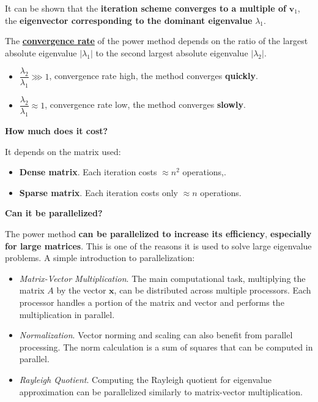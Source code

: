 It can be shown that the \textbf{iteration scheme converges to a multiple of} $\mathbf{v}_{1}$, the \textbf{eigenvector corresponding to the dominant eigenvalue} $\lambda_{1}$.

\highspace
The \textbf{\underline{convergence rate}} of the power method depends on the ratio of the largest absolute eigenvalue $\left|\lambda_{1}\right|$ to the second largest absolute eigenvalue $\left|\lambda_{2}\right|$.
\begin{itemize}
    \item $\dfrac{\lambda_{2}}{\lambda_{1}} \ggg 1$, convergence rate high, the method converges \textbf{quickly}.
    \item $\dfrac{\lambda_{2}}{\lambda_{1}} \approx 1$, convergence rate low, the method converges \textbf{slowly}.
\end{itemize}

\highspace
\begin{flushleft}
    \textcolor{Red2}{ \textbf{How much does it cost?}}
\end{flushleft}
It depends on the matrix used:
\begin{itemize}
    \item \textbf{Dense matrix}. Each iteration costs $\approx n^{2}$ operations,.
    \item \textbf{Sparse matrix}. Each iteration costs only $\approx n$ operations.
\end{itemize}

\highspace
\begin{flushleft}
    \textcolor{Green3}{ \textbf{Can it be parallelized?}}
\end{flushleft}
The power method \textbf{can be parallelized to increase its efficiency}, \textbf{especially for large matrices}. This is one of the reasons it is used to solve large eigenvalue problems. A simple introduction to parallelization:
\begin{itemize}
    \item \emph{Matrix-Vector Multiplication}. The main computational task, multiplying the matrix $A$ by the vector $\mathbf{x}$, can be distributed across multiple processors. Each processor handles a portion of the matrix and vector and performs the multiplication in parallel.

    \item \emph{Normalization}. Vector norming and scaling can also benefit from parallel processing. The norm calculation is a sum of squares that can be computed in parallel.
    
    \item \emph{Rayleigh Quotient}. Computing the Rayleigh quotient for eigenvalue approximation can be parallelized similarly to matrix-vector multiplication.
\end{itemize}
